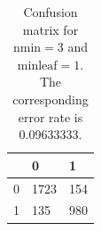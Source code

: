 \documentclass[12pt]{article}
\theoremstyle{definition}
\begin{document}
\begin{table}[h]
\centering
\begin{tabular}{r||ll}
     & 0    & 1   \\
    \hline \hline
    0 & 1723 & 154 \\
    1 & 135  & 980 \\
\end{tabular}
\caption{Confusion matrix for $\mathrm{nmin} = 3$ and $\mathrm{minleaf} = 1$.
The corresponding error rate is 0.09633333.
}
\label{confusion-matrix}
\end{table}
\end{document}
